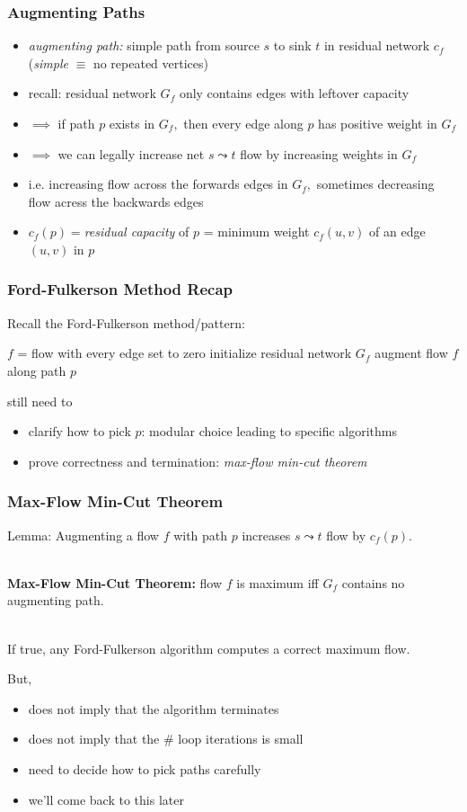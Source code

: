 \documentclass[10pt,aspectratio=169]{beamer}
\newcommand{\stanza}{ \\~\ }
\begin{document}
\begin{frame} \frametitle{Augmenting Paths}
\begin{itemize}
  \item \emph{augmenting path:} simple path from source $s$ to sink $t$ in residual
    network $c_f$
    (\emph{simple} $\equiv$ no repeated vertices)
  \item recall: residual network $G_f$ only contains edges with leftover capacity
  \item $\implies$ if path $p$ exists in $G_f,$ then every edge along $p$
    has positive weight in $G_f$
  \item $\implies$ we can legally increase net $s \leadsto t$ flow by increasing
    weights in $G_f$
  \item i.e. increasing flow across the forwards edges in $G_f,$ sometimes
    decreasing flow acress the backwards edges
  \item $c_f(p) = $\emph{residual capacity} of $p$ = minimum weight
    $c_f(u,v)$ of an edge $(u, v)$ in $p$
\end{itemize}
\end{frame}

\begin{frame} \frametitle{Ford-Fulkerson Method Recap}
Recall the Ford-Fulkerson method/pattern:
{\footnotesize
\begin{algorithmic}[1]
  \State $f$ = flow with every edge set to zero
  \State initialize residual network $G_f$
    \State augment flow $f$ along path $p$
  \EndWhile
  \State {}
  \EndFunction
\end{algorithmic}
}
\vspace{.5cm}
still need to
\begin{itemize}
  \item clarify how to pick $p$: modular choice leading to specific algorithms
  \item prove correctness and termination: \emph{max-flow min-cut theorem}
\end{itemize}
\end{frame}

\begin{frame} \frametitle{Max-Flow Min-Cut Theorem}
Lemma: Augmenting a flow $f$ with path $p$ increases $s \leadsto t$ flow by $c_f(p).$
\stanza

\textbf{Max-Flow Min-Cut Theorem:} flow $f$ is maximum iff $G_f$ contains no augmenting path.
\stanza

If true, any Ford-Fulkerson algorithm computes a correct maximum flow.

But,
\begin{itemize}
  \item does not imply that the algorithm terminates
  \item does not imply that the \# loop iterations is small
  \item need to decide how to pick paths carefully
  \item we'll come back to this later
\end{itemize}
\end{frame}
\end{document}
